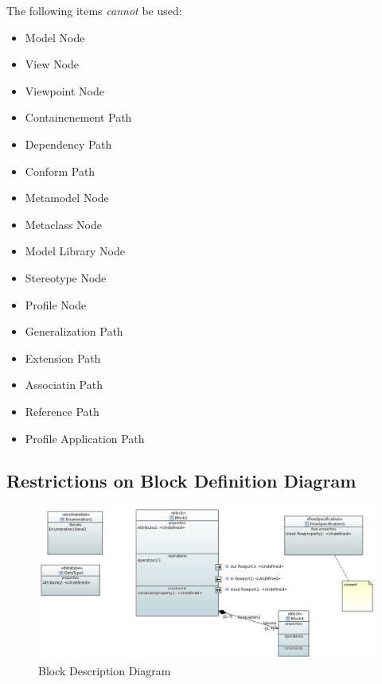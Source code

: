 The following items \emph{cannot} be used:
\begin{itemize}
\item Model Node
\item View Node
\item Viewpoint Node
\item Containenement Path
\item Dependency Path
\item Conform Path
\item Metamodel Node
\item Metaclass Node
\item Model Library Node
\item Stereotype Node
\item Profile Node
\item Generalization Path
\item Extension Path
\item Associatin Path
\item Reference Path
\item Profile Application Path
\end{itemize}

\subsection{Restrictions on Block Definition Diagram}



\begin{figure}[ht]
  \centering
  \includegraphics[width=\textwidth]{images/BDDDiagram.PNG}
  \caption{Block Description Diagram}
  \label{fig:Bdd}
\end{figure}



